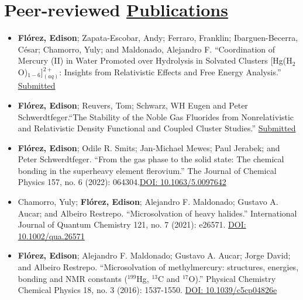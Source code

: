 \section{Peer-reviewed \href{.}{Publications}}

\begin{itemize}
    \small

    \item \textbf{Flórez, Edison}; Zapata-Escobar, Andy; Ferraro, Franklin; Ibarguen-Becerra, César; Chamorro, Yuly; and Maldonado, Alejandro F. ``Coordination of Mercury (II) in Water Promoted over Hydrolysis in Solvated Clusters [Hg(H$_2$O)$_{1-6}$]$^{2+}_{(aq)}$: Insights from Relativistic Effects and Free Energy Analysis.'' \href{.}{Submitted}

    \item \textbf{Flórez, Edison}; Reuvers, Tom; Schwarz, WH Eugen and Peter Schwerdtfeger.``The Stability of the Noble Gas Fluorides from Nonrelativistic and Relativistic Density Functional and Coupled Cluster Studies.'' \href{.}{Submitted}


    \item \textbf{Flórez, Edison}; Odile R. Smits; Jan-Michael Mewes; Paul Jerabek; and Peter Schwerdtfeger. ``From the gas phase to the solid state: The chemical bonding in the superheavy element flerovium.'' The Journal of Chemical Physics 157, no. 6 (2022): 064304.\href{https://www.doi.org/10.1063/5.0097642}{DOI: 10.1063/5.0097642}

    \item Chamorro, Yuly;  \textbf{Flórez, Edison}; Alejandro F. Maldonado; Gustavo A. Aucar; and Albeiro Restrepo. ``Microsolvation of heavy halides.'' International Journal of Quantum Chemistry 121, no. 7 (2021): e26571. \href{https://www.doi.org/10.1002/qua.26571}{DOI: 10.1002/qua.26571}

    \item \textbf{Flórez, Edison}; Alejandro F. Maldonado; Gustavo A. Aucar; Jorge David; and Albeiro Restrepo. ``Microsolvation of methylmercury: structures, energies, bonding and NMR constants ($^{199}$Hg, $^{13}$C and $^{17}$O).'' Physical Chemistry Chemical Physics 18, no. 3 (2016): 1537-1550. \href{https://www.doi.org/10.1039/c5cp04826e}{DOI: 10.1039/c5cp04826e}

\end{itemize}


